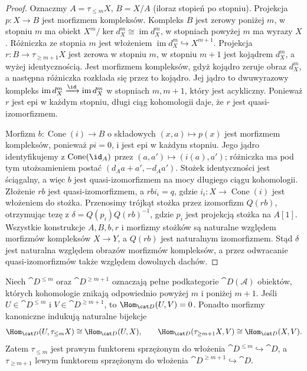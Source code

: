 \begin{proof}
Oznaczmy $A=\tau_{\le m}X$, $B=X/A$ (iloraz stopień po stopniu). Projekcja $p:X\to B$ jest morfizmem kompleksów. Kompleks $B$ jest zerowy poniżej $m$, w stopniu $m$ ma obiekt $X^m/\ker d_X^m\cong\operatorname{im}d_X^m$, w stopniach powyżej $m$ ma wyrazy $X$. Różniczka ze stopnia $m$ jest włożeniem $\operatorname{im}d_X^m\hookrightarrow X^{m+1}$. Projekcja $r:B\to\tau_{\ge m+1}X$ jest zerowa w stopniu $m$, w stopniu $m+1$ jest kojądrem $d_X^m$, a wyżej identycznością. Jest morfizmem kompleksów, gdyż kojądro zeruje obraz $d_X^m$, a następna różniczka rozkłada się przez to kojądro. Jej jądro to dwuwyrazowy kompleks $\operatorname{im}d_X^m\xrightarrow{\id}\operatorname{im}d_X^m$ w stopniach $m,m+1$, który jest acykliczny. Ponieważ $r$ jest epi w każdym stopniu, długi ciąg kohomologii daje, że $r$ jest quasi-izomorfizmem.

Morfizm $b:\operatorname{Cone}(i)\to B$ o składowych $(x,a)\mapsto p(x)$ jest morfizmem kompleksów, ponieważ $pi=0$, i jest epi w każdym stopniu. Jego jądro identyfikujemy z $\operatorname{Cone}(\id_A)$ przez $(a,a')\mapsto(i(a),a')$; różniczka ma pod tym utożsamieniem postać $(d_Aa+a',-d_Aa')$. Stożek identyczności jest ściągalny, a więc $b$ jest quasi-izomorfizmem na mocy długiego ciągu kohomologii. Złożenie $rb$ jest quasi-izomorfizmem, a $rb i_i=q$, gdzie $i_i:X\to\operatorname{Cone}(i)$ jest włożeniem do stożka. Przenosimy trójkąt stożka przez izomorfizm $Q(rb)$, otrzymując tezę z $\delta=Q(p_i)Q(rb)^{-1}$, gdzie $p_i$ jest projekcją stożka na $A[1]$. Wszystkie konstrukcje $A,B,b,r$ i morfizmy stożków są naturalne względem morfizmów kompleksów $X\to Y$, a $Q(rb)$ jest naturalnym izomorfizmem. Stąd $\delta$ jest naturalna względem obrazów morfizmów kompleksów, a przez odwracanie quasi-izomorfizmów także względem dowolnych dachów.
\end{proof}
\begin{wniosek}\label{cat:cor:truncation-adjunctions}
Niech $\cat D^{\le m}$ oraz $\cat D^{\ge m+1}$ oznaczają pełne podkategorie $\cat D(\mathcal A)$ obiektów, których kohomologie znikają odpowiednio powyżej $m$ i poniżej $m+1$. Jeśli $U\in\cat D^{\le m}$ i $V\in\cat D^{\ge m+1}$, to $\Hom_{\cat D}(U,V)=0$. Ponadto morfizmy kanoniczne indukują naturalne bijekcje
\[
 \Hom_{\cat D}(U,\tau_{\le m}X)\cong\Hom_{\cat D}(U,X),
 \qquad
 \Hom_{\cat D}(\tau_{\ge m+1}X,V)\cong\Hom_{\cat D}(X,V).
\]
Zatem $\tau_{\le m}$ jest prawym funktorem sprzężonym do włożenia $\cat D^{\le m}\hookrightarrow\cat D$, a $\tau_{\ge m+1}$ lewym funktorem sprzężonym do włożenia $\cat D^{\ge m+1}\hookrightarrow\cat D$.
\end{wniosek}
